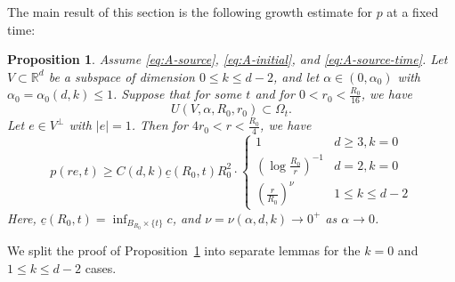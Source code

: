 \documentclass[11pt]{amsart}
\numberwithin{equation}{section}
\numberwithin{figure}{section}
\theoremstyle{plain}
\newtheorem{prop}[thm]{Proposition}
\theoremstyle{definition}
\theoremstyle{remark}
\theoremstyle{plain}
\def\R{\mathbb{R}}
\begin{document}
The main result of this section is the following growth estimate for $p$ at a fixed time:

\begin{prop}\label{prop:pressure_lower_bd}
Assume \eqref{eq:A-source}, \eqref{eq:A-initial}, and \eqref{eq:A-source-time}.
Let $V \subset \R^d$ be a subspace of dimension $0 \leq k \leq d-2$,  and let $\alpha\in (0, \alpha_0)$ with  $\alpha_0 = \alpha_0(d,k)\leq 1$. Suppose that for some $t$ and for $0 < r_0 < \frac{R_0}{16}$, we have
\[ U(V, \alpha, R_0, r_0) \subset \Omega_t. \]
Let $e\in V^\perp$ with $|e| = 1$. Then for $4r_0 < r < \frac{R_0}{4}$, we have
\[ p(re, t) \geq C(d,k)\underline{c}(R_0,t)R_0^2\cdot \begin{cases}
    1 & d\geq 3, k=0 \\
    (\log \frac{R_0}{r})^{-1} & d=2,k=0 \\
    (\tfrac{r}{R_0})^{\nu} & 1\leq k \leq d-2
\end{cases} \]
Here,
$\underline{c}(R_0, t) = \inf_{B_{R_0}\times \{t\}} c$, and $\nu=\nu(\alpha,d,k)\to 0^+$ as $\alpha \to 0$.
\end{prop}

We split the proof of Proposition~\ref{prop:pressure_lower_bd} into separate lemmas for the $k = 0$ and $1 \leq k \leq d-2$ cases. 
\end{document}
